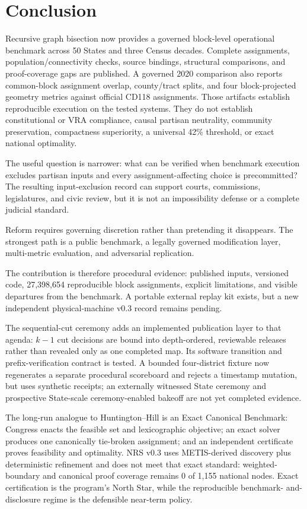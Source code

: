 \section{Conclusion}

Recursive graph bisection now provides a governed block-level operational
benchmark across 50 States and three Census decades. Complete assignments,
population/connectivity checks, source bindings, structural comparisons, and
proof-coverage gaps are published. A governed 2020 comparison also reports
common-block assignment overlap, county/tract splits, and four block-projected
geometry metrics against official CD118 assignments. Those artifacts establish reproducible
execution on the tested systems. They do not establish constitutional or VRA
compliance, causal partisan neutrality, community preservation, compactness
superiority, a universal 42\% threshold, or exact national optimality.

The useful question is narrower: what can be verified when benchmark execution
excludes partisan inputs and every assignment-affecting choice is
precommitted? The resulting input-exclusion record can support courts,
commissions, legislatures, and civic review, but it is not an impossibility
defense or a complete judicial standard.

Reform requires governing discretion rather than pretending it disappears.
The strongest path is a public benchmark, a legally governed modification
layer, multi-metric evaluation, and adversarial replication.

The contribution is therefore procedural evidence: published inputs,
versioned code, 27,398,654 reproducible block assignments, explicit
limitations, and visible departures from the benchmark. A portable external
replay kit exists, but a new independent physical-machine v0.3 record remains
pending.

The sequential-cut ceremony adds an implemented publication layer to that
agenda: $k-1$ cut decisions are bound into depth-ordered, reviewable releases
rather than revealed only as one completed map. Its software transition and
prefix-verification contract is tested. A bounded four-district fixture now
regenerates a separate procedural scoreboard and rejects a timestamp mutation,
but uses synthetic receipts; an externally witnessed State ceremony and
prospective State-scale ceremony-enabled bakeoff are not yet completed evidence.

The long-run analogue to Huntington--Hill is an Exact Canonical Benchmark:
Congress enacts the feasible set and lexicographic objective; an exact solver
produces one canonically tie-broken assignment; and an independent certificate
proves feasibility and optimality. NRS v0.3 uses METIS-derived discovery plus
deterministic refinement and does not meet that exact standard: weighted-
boundary and canonical proof coverage remains 0 of 1,155 national nodes. Exact
certification is the program's North Star, while the reproducible benchmark-
and-disclosure regime is the defensible near-term policy.
